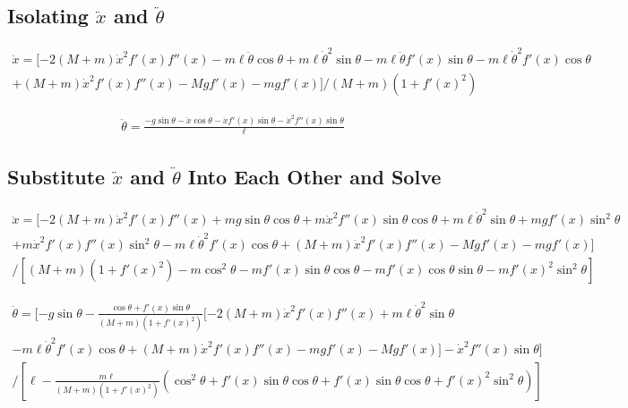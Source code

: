 \documentclass{article}
\begin{document}
\subsection{Isolating $\ddot x$ and $\ddot \theta$}
\begin{equation}
\begin{aligned}
\ddot x=[-2(M+m)\dot x^2f'(x)f''(x)-m\ell\ddot\theta\cos\theta+m\ell\dot\theta^2\sin\theta-m\ell\ddot\theta f'(x)\sin\theta-m\ell\dot\theta^2f'(x)\cos\theta\\+(M+m)\dot x^2 f'(x)f''(x)-Mgf'(x)-mgf'(x)]/(M+m)(1+f'(x)^2)
\end{aligned}
\end{equation}

\begin{equation}
\begin{aligned}
\ddot \theta=\frac{-g\sin\theta-\ddot x\cos\theta-\ddot xf'(x)\sin\theta-\dot x^2f''(x)\sin\theta}{\ell}
\end{aligned}
\end{equation}
\subsection{Substitute $\ddot x$ and $\ddot \theta$ Into Each Other and Solve}
\begin{equation}
\begin{aligned}
\ddot x=[-2(M+m)\dot x^2f'(x)f''(x)+mg\sin\theta\cos\theta+m\dot x^2 f''(x)\sin\theta\cos\theta+m\ell\dot\theta^2\sin\theta+mgf'(x)\sin^2\theta\\+m\dot x^2 f'(x)f''(x)\sin^2\theta-m\ell\dot\theta^2f'(x)\cos\theta+(M+m)\dot x^2f'(x)f''(x)-Mgf'(x)-mgf'(x)]\\/[(M+m)(1+f'(x)^2)-m\cos^2\theta-mf'(x)\sin\theta\cos\theta-mf'(x)\cos\theta\sin\theta-mf'(x)^2\sin^2\theta]
\end{aligned}
\end{equation}

\begin{equation}
\begin{aligned}
\ddot \theta=[-g\sin\theta-\frac{\cos\theta+f'(x)\sin\theta}{(M+m)(1+f'(x)^2)}[-2(M+m)\dot x^2f'(x)f''(x)+m\ell\dot\theta^2\sin\theta\\-m\ell\dot\theta^2f'(x)\cos\theta+(M+m)\dot x^2f'(x)f''(x)-mgf'(x)-Mgf'(x)]-\dot x^2f''(x)\sin\theta]\\/[\ell-\frac{m\ell}{(M+m)(1+f'(x)^2)}(\cos^2\theta+f'(x)\sin\theta\cos\theta+f'(x)\sin\theta\cos\theta+f'(x)^2\sin^2\theta)]
\end{aligned}
\end{equation}
\end{document}
